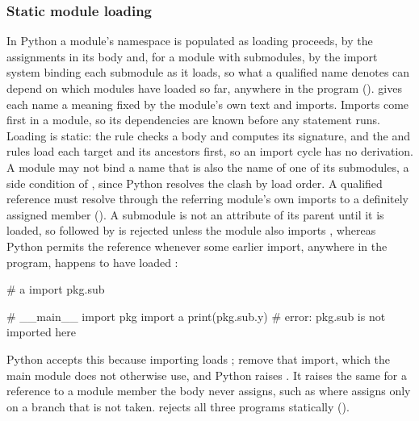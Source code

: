 \subsubsection{Static module loading}
\label{sec:load-order}

In Python a module's namespace is populated as loading proceeds, by the assignments in its body and, for
a module with submodules, by the import system binding each submodule as it loads, so what a qualified name denotes can
depend on which modules have loaded so far, anywhere in the program (). \PurePy gives each name a meaning fixed by the
module's own text and imports. Imports come first in a module, so its dependencies are known before any
statement runs. Loading is static: the  rule checks a body and computes its signature,
and the  and  rules load each target and its ancestors first, so
an import cycle has no derivation. A module may not bind a name that is also the name of one of its
submodules, a side condition of , since Python resolves the clash by load order. A
qualified reference must resolve through the referring module's own imports to a definitely assigned
member (). A submodule is not an attribute of its parent until it is loaded, so
 followed by  is rejected unless the module also imports
, whereas Python permits the reference whenever some earlier import, anywhere in the
program, happens to have loaded :

\begin{minipage}[t]{0.3\textwidth}
\begin{python}
# a
import pkg.sub
\end{python}
\end{minipage}
\hfill
\begin{minipage}[t]{0.6\textwidth}
\begin{python}
# __main__
import pkg
import a
print(pkg.sub.y)  # error: pkg.sub is not imported here
\end{python}
\end{minipage}

\noindent Python accepts this because importing  loads ; remove that import,
which the main module does not otherwise use, and Python raises . It raises the
same for a reference to a module member the body never assigns, such as  where
 assigns  only on a branch that is not taken. \PurePy rejects all three programs
statically ().

